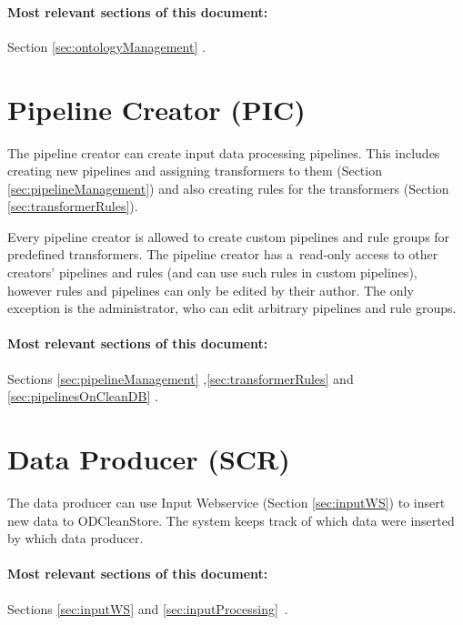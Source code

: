	\paragraph{Most relevant sections of this document:} Section \ref{sec:ontologyManagement} .

\section[Pipeline Creator]{Pipeline Creator (PIC)}
\label{sec:pic}
	The pipeline creator can create input data processing pipelines. This includes creating new pipelines and assigning transformers to them (Section \ref{sec:pipelineManagement}) and also creating rules for the transformers (Section \ref{sec:transformerRules}).

	Every pipeline creator is allowed to create custom pipelines and rule groups for predefined transformers. The pipeline creator has a~read-only access to other creators' pipelines and rules (and can use such rules in custom pipelines), however rules and pipelines can only be edited by their author. The only exception is the administrator, who can edit arbitrary pipelines and rule groups.

	\paragraph{Most relevant sections of this document:} Sections \ref{sec:pipelineManagement} ,\linebreak[4] \ref{sec:transformerRules}  and \ref{sec:pipelinesOnCleanDB} .
	
\section[Data Producer]{Data Producer (SCR)} 
\label{sec:scr}
  The data producer can use Input Webservice (Section \ref{sec:inputWS}) to insert new data to ODCleanStore. The system keeps track of which data were inserted by which data producer.

  \paragraph{Most relevant sections of this document:} Sections \ref{sec:inputWS}  and \linebreak[4] \ref{sec:inputProcessing}~.

